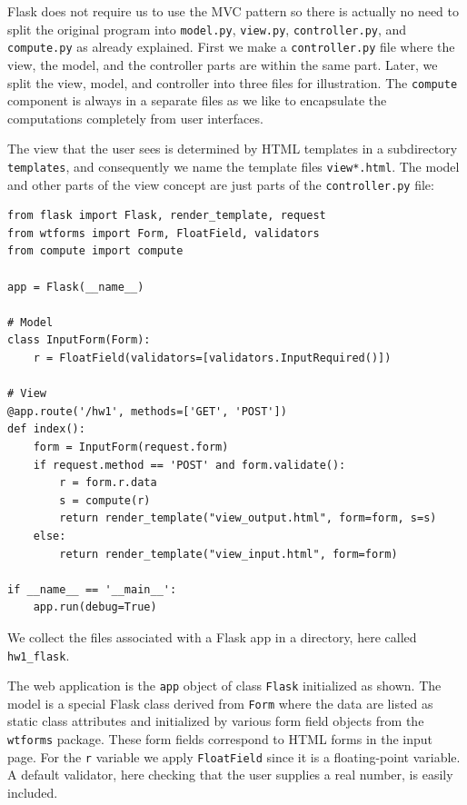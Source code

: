 \documentclass[%
oneside,                 %
final,                   %
10pt]{article}
\begin{document}
Flask does not require us to use the MVC pattern so there is actually
no need to split the original program into \Verb!model.py!, \Verb!view.py!,
\Verb!controller.py!, and \Verb!compute.py! as already explained.  First we make
a \Verb!controller.py! file where the view, the model, and the controller
parts are within the same part. Later, we split the view, model, and
controller into three files for illustration. The \Verb!compute! component
is always in a separate files as we like to encapsulate the
computations completely from user interfaces.


The view that the user sees is determined by
HTML templates in a subdirectory \Verb!templates!, and consequently
we name the template files \Verb!view*.html!.
The model and other parts of the view concept are just parts of
the \Verb!controller.py! file:

\begin{Verbatim}[numbers=none,fontsize=\fontsize{9pt}{9pt},baselinestretch=0.85]
from flask import Flask, render_template, request
from wtforms import Form, FloatField, validators
from compute import compute

app = Flask(__name__)

# Model
class InputForm(Form):
    r = FloatField(validators=[validators.InputRequired()])

# View
@app.route('/hw1', methods=['GET', 'POST'])
def index():
    form = InputForm(request.form)
    if request.method == 'POST' and form.validate():
        r = form.r.data
        s = compute(r)
        return render_template("view_output.html", form=form, s=s)
    else:
        return render_template("view_input.html", form=form)

if __name__ == '__main__':
    app.run(debug=True)
\end{Verbatim}
We collect the files associated with a Flask app in a directory,
here called \Verb!hw1_flask!.

The web application is the \Verb!app! object of class \Verb!Flask! initialized
as shown. The model is a special Flask class derived from \Verb!Form!
where the data are listed as static class attributes and initialized
by various form field objects from the \Verb!wtforms! package.
These form fields correspond to HTML forms in the input page.
For the \Verb!r! variable we apply \Verb!FloatField! since it is a floating-point
variable. A default validator, here checking that the user supplies
a real number, is easily included.
\end{document}
